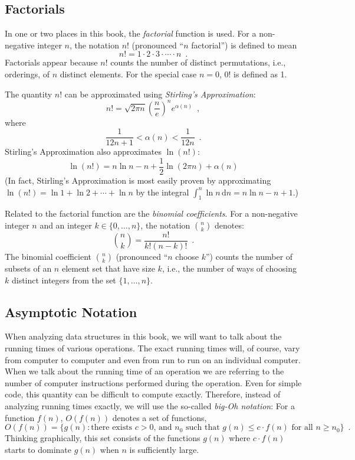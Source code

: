 \subsection{Factorials}

In one or two places in this book, the \emph{factorial} function is used.
For a non-negative integer $n$, the notation $n!$ (pronounced ``$n$ factorial'') is defined to mean 
\[
   n! = 1\cdot2\cdot3\cdot\cdots\cdot n \enspace .
\]
Factorials appear because $n!$ counts the number of distinct
permutations, i.e., orderings, of $n$ distinct elements.  For the special case $n=0$, $0!$ is defined as 1. 

The quantity $n!$ can be approximated using \emph{Stirling's Approximation}:
\[
	n! 
   = \sqrt{2\pi n}\left(\frac{n}{e}\right)^{n}e^{\alpha(n)} \enspace ,
\]
where
\[  
   \frac{1}{12n+1} <  \alpha(n) < \frac{1}{12n}  \enspace .
\]
Stirling's Approximation also approximates $\ln(n!)$:
\[
   \ln(n!) = n\ln n - n + \frac{1}{2}\ln(2\pi n) + \alpha(n)
\]
(In fact, Stirling's Approximation is most easily proven by approximating
$\ln(n!)=\ln 1 + \ln 2  + \cdots + \ln n$ by the integral
$\int_1^n \ln n\,\mathrm{d}n = n\ln n - n +1$.)

Related to the factorial function are the \emph{binomial coefficients}.
For a non-negative integer $n$ and an integer $k\in\{0,\ldots,n\}$,
the notation $\binom{n}{k}$ denotes:
\[
   \binom{n}{k} = \frac{n!}{k!(n-k)!} \enspace .
\]
The binomial coefficient $\binom{n}{k}$ (pronounced ``$n$ choose $k$'')
counts the number of subsets of an $n$ element set that have size $k$,
i.e., the number of ways of choosing $k$ distinct integers from the
set $\{1,\ldots,n\}$.

\subsection{Asymptotic Notation}

When analyzing data structures in this book, we will want to talk about
the running times of various operations.  The exact running times will,
of course, vary from computer to computer and even from run to run on an
individual computer.  When we talk about the running time of an operation
we are referring to the number of computer instructions performed during
the operation.  Even for simple code, this quantity can be difficult to
compute exactly.  Therefore, instead of analyzing running times exactly,
we will use the so-called \emph{big-Oh notation}: For a function $f(n)$,
$O(f(n))$ denotes a set of functions,
\[
   O(f(n)) = \{g(n):\mbox{there exists $c>0$, and $n_0$ such that
             $g(n) \le c\cdot f(n)$ for all $n\ge n_0$}   \} \enspace .
\]
Thinking graphically, this set consists of the functions $g(n)$ where
$c\cdot f(n)$ starts to dominate $g(n)$ when $n$ is sufficiently large.

